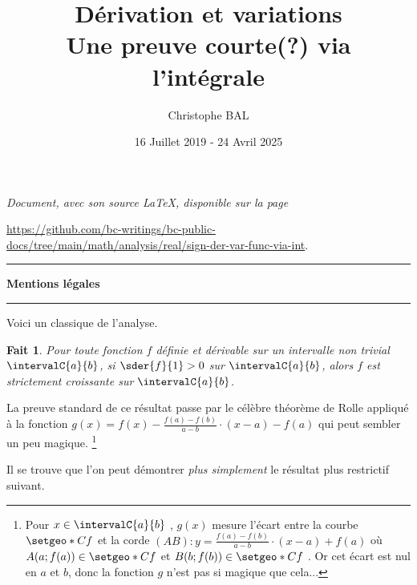\documentclass[12pt]{amsart}
\newtheorem{fact}{Fait}
\begin{document}
\title{Dérivation et variations \\ Une preuve courte(?) via l'intégrale}
\author{Christophe BAL}
\date{16 Juillet 2019 - 24 Avril 2025}

\maketitle

\begin{center}
    \itshape
    Document, avec son source \LaTeX, disponible sur la page

    \url{https://github.com/bc-writings/bc-public-docs/tree/main/math/analysis/real/sign-der-var-func-via-int}.
\end{center}


\bigskip


\begin{center}
    \hrule\vspace{.3em}
    {
        \fontsize{1.35em}{1em}\selectfont
        \textbf{Mentions \og légales \fg}
    }

    \vspace{0.45em}
    \doclicenseThis
    \hrule
\end{center}


\vspace{1em}


Voici un classique de l'analyse.


\begin{fact}
    Pour toute fonction $f$ définie et dérivable sur un intervalle non trivial $\intervalC{a}{b}$,
    si $\sder{f}{1} > 0$ sur $\intervalC{a}{b}$,
    alors $f$ est strictement croissante sur $\intervalC{a}{b}$.
\end{fact}

La preuve standard de ce résultat passe par le célèbre théorème de Rolle appliqué à la fonction $g(x) = f(x) - \frac{f(a) - f(b)}{a - b} \cdot (x - a) - f(a)$ qui peut sembler un peu magique.%
\footnote{
    Pour $x \in \intervalC{a}{b}$ , $g(x)$ mesure l'écart entre la courbe $\setgeo*{C}{f}$ et la corde $(AB) : y = \frac{f(a) - f(b)}{a - b} \cdot (x - a) + f(a)$ où $A(a ; f(a)) \in \setgeo*{C}{f}$ et $B(b ; f(b)) \in \setgeo*{C}{f}$ .
    Or cet écart est nul en $a$ et $b$, donc la fonction $g$ n'est pas si magique que cela...
}


\bigskip


Il se trouve que l'on peut démontrer \emph{\og plus simplement \fg} le résultat plus restrictif suivant.
\end{document}
